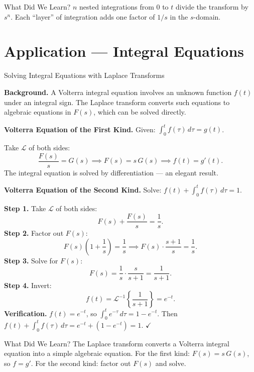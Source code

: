 \documentclass[12pt,a4paper]{article}
\begin{document}
\begin{learnbox}{What Did We Learn?}
$n$ nested integrations from $0$ to $t$ divide the transform by $s^n$.
Each ``layer'' of integration adds one factor of $1/s$ in the $s$-domain.
\end{learnbox}

\section{Application --- Integral Equations}

\begin{infobox}{Solving Integral Equations with Laplace Transforms}

\noindent\textbf{Background.} A Volterra integral equation involves an unknown function
$f(t)$ under an integral sign. The Laplace transform converts such equations to
algebraic equations in $F(s)$, which can be solved directly.

\medskip
\noindent\textbf{Volterra Equation of the First Kind.}
Given: $\displaystyle\int_0^t f(\tau)\,d\tau = g(t)$.

Take $\mathcal{L}$ of both sides:
\[
  \frac{F(s)}{s} = G(s) \implies F(s) = s\,G(s) \implies f(t) = g'(t).
\]
The integral equation is solved by differentiation --- an elegant result.

\medskip
\noindent\textbf{Volterra Equation of the Second Kind.}
Solve: $f(t) + \displaystyle\int_0^t f(\tau)\,d\tau = 1$.

\textbf{Step 1.} Take $\mathcal{L}$ of both sides:
\[
  F(s) + \frac{F(s)}{s} = \frac{1}{s}.
\]
\textbf{Step 2.} Factor out $F(s)$:
\[
  F(s)\!\left(1 + \frac{1}{s}\right) = \frac{1}{s}
  \implies F(s)\cdot\frac{s+1}{s} = \frac{1}{s}.
\]
\textbf{Step 3.} Solve for $F(s)$:
\[
  F(s) = \frac{1}{s}\cdot\frac{s}{s+1} = \frac{1}{s+1}.
\]
\textbf{Step 4.} Invert:
\[
  f(t) = \mathcal{L}^{-1}\!\left\{\frac{1}{s+1}\right\} = e^{-t}.
\]
\textbf{Verification.} $f(t) = e^{-t}$, so $\int_0^t e^{-\tau}\,d\tau = 1 - e^{-t}$.
Then $f(t) + \int_0^t f(\tau)\,d\tau = e^{-t} + (1 - e^{-t}) = 1$. $\checkmark$
\end{infobox}

\begin{learnbox}{What Did We Learn?}
The Laplace transform converts a Volterra integral equation into a simple algebraic
equation. For the first kind: $F(s) = s\,G(s)$, so $f = g'$. For the second kind:
factor out $F(s)$ and solve.
\end{learnbox}
\end{document}
